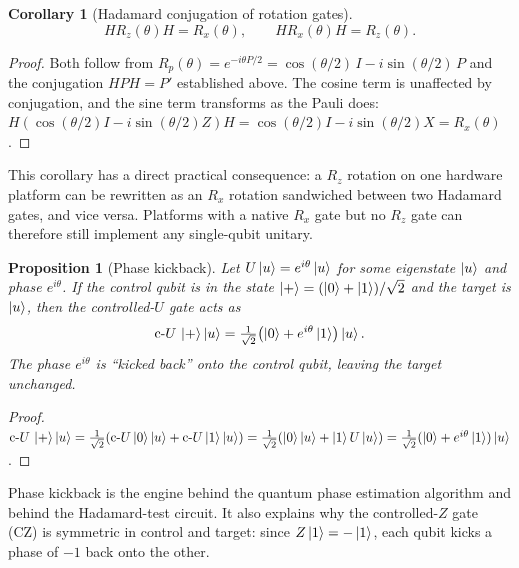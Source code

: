 \documentclass[12pt, a4paper, oneside]{report}
\theoremstyle{plain}
\newtheorem{corollary}[theorem]{Corollary}
\newtheorem{proposition}[theorem]{Proposition}
\theoremstyle{definition}
\theoremstyle{remark}
\newcommand{\cU}{\mathrm{c}\text{-}U}
\newcommand{\Rx}{R_x}
\newcommand{\Rz}{R_z}
\newcommand{\Rp}{R_p}
\begin{document}
\begin{corollary}[Hadamard conjugation of rotation gates]
	\label{cor:h-conj-rot}
	\[
		H\Rz(\theta)H = \Rx(\theta), \qquad H\Rx(\theta)H = \Rz(\theta).
	\]
\end{corollary}

\begin{proof}
	Both follow from $\Rp(\theta) = e^{-i\theta P/2} = \cos(\theta/2)\,I - i\sin(\theta/2)\,P$
	and the conjugation $HPH = P'$ established above. The cosine term is unaffected by conjugation,
	and the sine term transforms as the Pauli does:
	$H(\cos(\theta/2)I - i\sin(\theta/2)Z)H = \cos(\theta/2)I - i\sin(\theta/2)X = \Rx(\theta)$.
\end{proof}

This corollary has a direct practical consequence: a $\Rz$ rotation on one hardware
platform can be rewritten as an $\Rx$ rotation sandwiched between two Hadamard gates,
and vice versa. Platforms with a native $\Rx$ gate but no $\Rz$ gate can therefore still
implement any single-qubit unitary.

\begin{proposition}[Phase kickback]
	\label{prop:phase-kickback}
	Let $U\ket{u} = e^{i\theta}\ket{u}$ for some eigenstate $\ket{u}$ and phase $e^{i\theta}$.
	If the control qubit is in the state $\ket{+} = (\ket{0}+\ket{1})/\sqrt{2}$ and the target
	is $\ket{u}$, then the controlled-$U$ gate acts as
	\[
		\cU\,\ket{+}\ket{u}
		= \tfrac{1}{\sqrt{2}}\bigl(\ket{0}+e^{i\theta}\ket{1}\bigr)\ket{u}.
	\]
	The phase $e^{i\theta}$ is ``kicked back'' onto the control qubit, leaving the target unchanged.
\end{proposition}

\begin{proof}
	$\cU\,\ket{+}\ket{u}
		= \frac{1}{\sqrt{2}}(\cU\ket{0}\ket{u}+\cU\ket{1}\ket{u})
		= \frac{1}{\sqrt{2}}(\ket{0}\ket{u}+\ket{1}U\ket{u})
		= \frac{1}{\sqrt{2}}(\ket{0}+e^{i\theta}\ket{1})\ket{u}$.
\end{proof}

Phase kickback is the engine behind the quantum phase estimation algorithm and behind the
Hadamard-test circuit. It also explains why the controlled-$Z$ gate (CZ) is symmetric in
control and target: since $Z\ket{1} = -\ket{1}$, each qubit kicks a phase of $-1$ back onto
the other.
\end{document}
